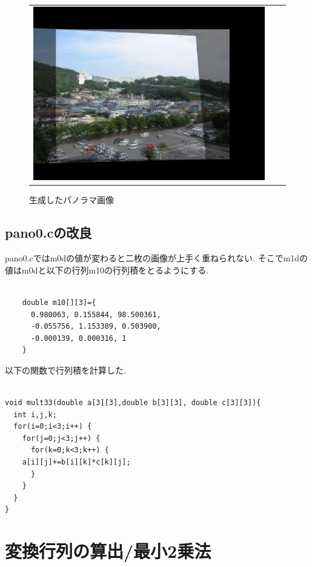 \documentclass[a4j]{jarticle}
\begin{document}
\begin{figure}[htbp]
\begin{tabular}{ccc}
\begin{minipage}{0.4\hsize}
\includegraphics[bb=0 0 1024 768,scale=.15]{../2/panoout.jpg}
\caption{生成したパノラマ画像}
\end{minipage}
\end{tabular}
\end{figure}

\subsection{pano0.cの改良}
pano0.cではm0dの値が変わると二枚の画像が上手く重ねられない. 
そこでm1dの値はm0dと以下の行列m10の行列積をとるようにする.
\begin{verbatim}

    double m10[][3]={
      0.980063, 0.155844, 98.500361,
      -0.055756, 1.153389, 0.503900,
      -0.000139, 0.000316, 1
    }

\end{verbatim}

以下の関数で行列積を計算した.　
\begin{verbatim}

void mult33(double a[3][3],double b[3][3], double c[3][3]){
  int i,j,k;
  for(i=0;i<3;i++) {
    for(j=0;j<3;j++) {
      for(k=0;k<3;k++) {
	a[i][j]+=b[i][k]*c[k][j];
      }
    }
  }
}
\end{verbatim}

\section{変換行列の算出/最小2乗法}
\end{document}

